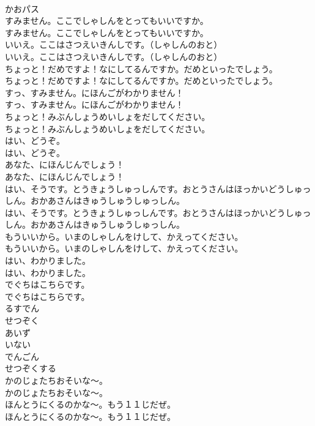 \documentclass[8pt]{extreport}
\begin{document}
\begin{CJK}{UTF8}{min}
\\	かおパス
\\	すみません。ここでしゃしんをとってもいいですか。	
\\	すみません。ここでしゃしんをとってもいいですか。 
\\	いいえ。ここはさつえいきんしです。（しゃしんのおと）	
\\	いいえ。ここはさつえいきんしです。（しゃしんのおと） 
\\	ちょっと！だめですよ！なにしてるんですか。だめといったでしょう。	
\\	ちょっと！だめですよ！なにしてるんですか。だめといったでしょう。 
\\	すっ、すみません。にほんごがわかりません！	
\\	すっ、すみません。にほんごがわかりません！ 
\\	ちょっと！みぶんしょうめいしょをだしてください。	
\\	ちょっと！みぶんしょうめいしょをだしてください。 
\\	はい、どうぞ。	
\\	はい、どうぞ。 
\\	あなた、にほんじんでしょう！	
\\	あなた、にほんじんでしょう！ 
\\	はい、そうです。とうきょうしゅっしんです。おとうさんはほっかいどうしゅっしん。おかあさんはきゅうしゅうしゅっしん。	
\\	はい、そうです。とうきょうしゅっしんです。おとうさんはほっかいどうしゅっしん。おかあさんはきゅうしゅうしゅっしん。 
\\	もういいから。いまのしゃしんをけして、かえってください。	
\\	もういいから。いまのしゃしんをけして、かえってください。 
\\	はい、わかりました。	
\\	はい、わかりました。 
\\	でぐちはこちらです。	
\\	でぐちはこちらです。 
\\	るすでん
\\	せつぞく
\\	あいず
\\	いない
\\	でんごん
\\	せつぞくする
\\	かのじょたちおそいな〜。	
\\	かのじょたちおそいな〜。 
\\	ほんとうにくるのかな〜。もう１１じだぜ。	
\\	ほんとうにくるのかな〜。もう１１じだぜ。 

\end{CJK}
\end{document}

